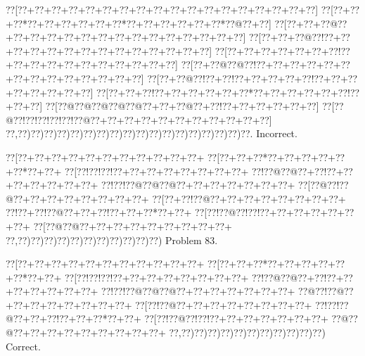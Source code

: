 \documentclass[a5paper]{article}
\begin{document}
\begin{center}
{\goo
\0??[\0??+\0??+\0??+\0??+\0??+\0??+\0??+\0??+\0??+\0??+\0??+\0??+\0??+\0??+\0??+\0??+\0??+\0??]
\0??[\0??+\0??+\0??*\0??+\0??+\0??+\0??+\0??+\0??*\0??+\0??+\0??+\0??+\0??+\0??*\0??@\0??+\0??]
\0??[\0??+\0??+\0??@\0??+\0??+\0??+\0??+\0??+\0??+\0??+\0??+\0??+\0??+\0??+\0??+\0??+\0??+\0??]
\0??[\0??+\0??+\0??@\0??!\0??+\0??+\0??+\0??+\0??+\0??+\0??+\0??+\0??+\0??+\0??+\0??+\0??+\0??]
\0??[\0??+\0??+\0??+\0??+\0??+\0??+\0??!\0??+\0??+\0??+\0??+\0??+\0??+\0??+\0??+\0??+\0??+\0??]
\0??[\0??+\0??@\0??@\0??!\0??+\0??+\0??+\0??+\0??+\0??+\0??+\0??+\0??+\0??+\0??+\0??+\0??+\0??]
\0??[\0??+\0??@\0??!\0??+\0??!\0??+\0??+\0??+\0??+\0??!\0??+\0??+\0??+\0??+\0??+\0??+\0??+\0??]
\0??[\0??+\0??+\0??!\0??+\0??+\0??+\0??+\0??+\0??*\0??+\0??+\0??+\0??+\0??+\0??!\0??+\0??+\0??]
\0??[\0??@\0??@\0??@\0??@\0??@\0??+\0??+\0??@\0??+\0??!\0??+\0??+\0??+\0??+\0??+\0??]
\0??[\0??@\0??!\0??!\0??!\0??!\0??!\0??@\0??+\0??+\0??+\0??+\0??+\0??+\0??+\0??+\0??+\0??+\0??]
\0??,\0??)\0??)\0??)\0??)\0??)\0??)\0??)\0??)\0??)\0??)\0??)\0??)\0??)\0??)\0??)\0??)\0??)\0??.
}
Incorrect. 

\end{center}
\newpage
\begin{center}
{\goo
\0??[\0??+\0??+\0??+\0??+\0??+\0??+\0??+\0??+\0??+\0??+\0??+
\0??[\0??+\0??+\0??*\0??+\0??+\0??+\0??+\0??+\0??*\0??+\0??+
\0??[\0??!\0??!\0??!\0??+\0??+\0??+\0??+\0??+\0??+\0??+\0??+
\0??!\0??@\0??@\0??+\0??!\0??+\0??+\0??+\0??+\0??+\0??+\0??+
\0??!\0??!\0??@\0??@\0??@\0??+\0??+\0??+\0??+\0??+\0??+\0??+
\0??[\0??@\0??!\0??@\0??+\0??+\0??+\0??+\0??+\0??+\0??+\0??+
\0??[\0??+\0??!\0??@\0??+\0??+\0??+\0??+\0??+\0??+\0??+\0??+
\0??!\0??+\0??!\0??@\0??+\0??+\0??!\0??+\0??+\0??*\0??+\0??+
\0??[\0??!\0??@\0??!\0??!\0??+\0??+\0??+\0??+\0??+\0??+\0??+
\0??[\0??@\0??@\0??+\0??+\0??+\0??+\0??+\0??+\0??+\0??+\0??+
\0??,\0??)\0??)\0??)\0??)\0??)\0??)\0??)\0??)\0??)\0??)\0??)
}
Problem 83.

\end{center}
\begin{center}
{\goo
\0??[\0??+\0??+\0??+\0??+\0??+\0??+\0??+\0??+\0??+\0??+\0??+
\0??[\0??+\0??+\0??*\0??+\0??+\0??+\0??+\0??+\0??*\0??+\0??+
\0??[\0??!\0??!\0??!\0??+\0??+\0??+\0??+\0??+\0??+\0??+\0??+
\0??!\0??@\0??@\0??+\0??!\0??+\0??+\0??+\0??+\0??+\0??+\0??+
\0??!\0??!\0??@\0??@\0??@\0??+\0??+\0??+\0??+\0??+\0??+\0??+
\0??@\0??!\0??@\0??+\0??+\0??+\0??+\0??+\0??+\0??+\0??+
\0??[\0??!\0??@\0??+\0??+\0??+\0??+\0??+\0??+\0??+\0??+
\0??!\0??!\0??@\0??+\0??+\0??!\0??+\0??+\0??*\0??+\0??+
\0??[\0??!\0??@\0??!\0??!\0??+\0??+\0??+\0??+\0??+\0??+\0??+
\0??@\0??@\0??+\0??+\0??+\0??+\0??+\0??+\0??+\0??+\0??+
\0??,\0??)\0??)\0??)\0??)\0??)\0??)\0??)\0??)\0??)\0??)\0??)
}
Correct. 

\end{center}
\end{document}
